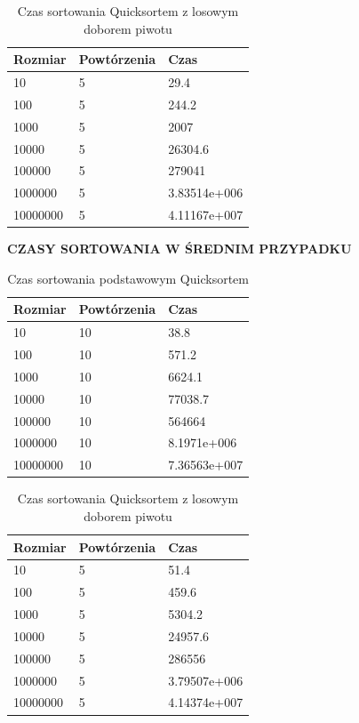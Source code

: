 \documentclass[10pt,oneside]{mwbk}
\begin{document}
	
	\begin{table}[!h]
	\centering
	\begin{tabular}{| l | l | l |}
	\hline
		Rozmiar & Powtórzenia & Czas         \\ \hline
10&5&29.4\\ \hline
100&5&244.2\\ \hline
1000&5&2007\\ \hline
10000&5&26304.6\\ \hline
100000&5&279041\\ \hline
1000000&5&3.83514e+006\\ \hline
10000000&5&4.11167e+007\\ \hline
	\end{tabular}
		\caption{Czas sortowania Quicksortem z losowym doborem piwotu}
	\end{table}
	
	
	\newpage
	\textbf{CZASY SORTOWANIA W ŚREDNIM PRZYPADKU}
	\\
	
	\begin{table}[!h]
	\centering
	\begin{tabular}{| l | l | l |}
	\hline
	Rozmiar & Powtórzenia & Czas         \\ \hline
10&10&38.8\\ \hline 
100&10&571.2\\ \hline
1000&10&6624.1\\ \hline
10000&10&77038.7\\ \hline
100000&10&564664\\ \hline
1000000&10&8.1971e+006\\ \hline
10000000&10&7.36563e+007\\ \hline
	\end{tabular}
		\caption{Czas sortowania podstawowym Quicksortem}
	\end{table}
	

	\begin{table}[!h]
	\centering
	\begin{tabular}{| l | l | l |}
	\hline
		Rozmiar & Powtórzenia & Czas         \\ \hline
10&5&51.4\\ \hline
100&5&459.6\\ \hline
1000&5&5304.2\\ \hline
10000&5&24957.6\\ \hline
100000&5&286556\\ \hline
1000000&5&3.79507e+006\\ \hline
10000000&5&4.14374e+007\\ \hline
	\end{tabular}
	\caption{Czas sortowania Quicksortem z losowym doborem piwotu}
	\end{table}
\end{document}
